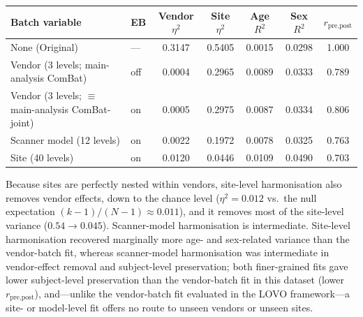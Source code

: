 \documentclass[12pt,a4paper]{article}
\begin{document}
\begin{table}[H]
\centering
\footnotesize
\setlength{\tabcolsep}{2.5pt}
\begin{tabular}{llccccc}
\toprule
\textbf{Batch variable} & \textbf{EB} & \textbf{Vendor $\eta^2$} & \textbf{Site $\eta^2$} & \textbf{Age $R^2$} & \textbf{Sex $R^2$} & \textbf{$r_{\text{pre,post}}$} \\
\midrule
None (Original) & --- & 0.3147 & 0.5405 & 0.0015 & 0.0298 & 1.000 \\
Vendor (3 levels; main-analysis ComBat) & off & 0.0004 & 0.2965 & 0.0089 & 0.0333 & 0.789 \\
Vendor (3 levels; ${\equiv}$ main-analysis ComBat-joint) & on & 0.0005 & 0.2975 & 0.0087 & 0.0334 & 0.806 \\
Scanner model (12 levels) & on & 0.0022 & 0.1972 & 0.0078 & 0.0325 & 0.763 \\
Site (40 levels) & on & 0.0120 & 0.0446 & 0.0109 & 0.0490 & 0.703 \\
\bottomrule
\end{tabular}
\end{table}

Because sites are perfectly nested within vendors, site-level harmonisation also removes vendor effects, down to the chance level ($\eta^2=0.012$ vs.\ the null expectation $(k-1)/(N-1)\approx0.011$), and it removes most of the site-level variance ($0.54\rightarrow0.045$). Scanner-model harmonisation is intermediate. Site-level harmonisation recovered marginally more age- and sex-related variance than the vendor-batch fit, whereas scanner-model harmonisation was intermediate in vendor-effect removal and subject-level preservation; both finer-grained fits gave lower subject-level preservation than the vendor-batch fit in this dataset (lower $r_{\text{pre,post}}$), and---unlike the vendor-batch fit evaluated in the LOVO framework---a site- or model-level fit offers no route to unseen vendors or unseen sites.
\end{document}
